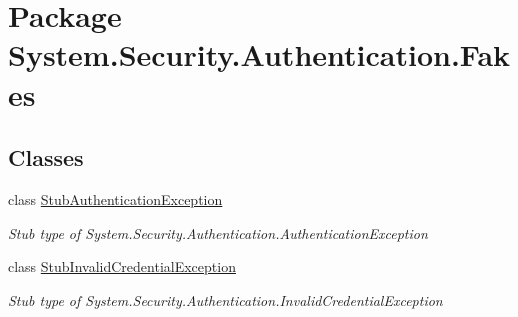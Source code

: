 \hypertarget{namespace_system_1_1_security_1_1_authentication_1_1_fakes}{\section{Package System.\-Security.\-Authentication.\-Fakes}
\label{namespace_system_1_1_security_1_1_authentication_1_1_fakes}
}
\subsection*{Classes}
\begin{DoxyCompactItemize}
\item 
class \hyperlink{class_system_1_1_security_1_1_authentication_1_1_fakes_1_1_stub_authentication_exception}{Stub\-Authentication\-Exception}
\begin{DoxyCompactList}\small\item\em Stub type of System.\-Security.\-Authentication.\-Authentication\-Exception\end{DoxyCompactList}\item 
class \hyperlink{class_system_1_1_security_1_1_authentication_1_1_fakes_1_1_stub_invalid_credential_exception}{Stub\-Invalid\-Credential\-Exception}
\begin{DoxyCompactList}\small\item\em Stub type of System.\-Security.\-Authentication.\-Invalid\-Credential\-Exception\end{DoxyCompactList}\end{DoxyCompactItemize}
